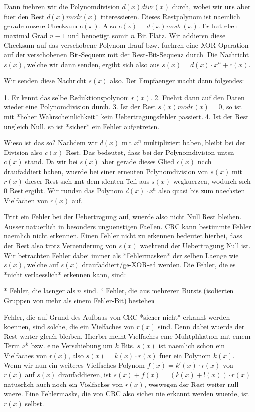 Dann fuehren wir die Polynomdivision $d(x) div r(x)$ durch, wobei wir uns aber
fuer den Rest $d(x) mod r(x)$ interessieren. Dieses Restpolynom ist naemlich
gerade unsere Checksum $c(x)$. Also $c(x) = d(x) mod r(x)$. Es hat eben maximal
Grad $n - 1$ und benoetigt somit $n$ Bit Platz. Wir addieren diese Checksum
auf das verschobene Polynom drauf bzw. fuehren eine XOR-Operation auf der
verschobenen Bit-Sequenz mit der Rest-Bit-Sequenz durch. Die Nachricht $s(x)$,
welche wir dann senden, ergibt sich also aus $s(x) = d(x) \cdot x^n + c(x)$.

Wir senden diese Nachricht $s(x)$ also. Der Empfaenger macht dann folgendes:

1. Er kennt das selbe Reduktionspolynom $r(x)$.
2. Fuehrt dann auf den Daten wieder eine Polynomdivision durch.
3. Ist der Rest $s(x) mod r(x) = 0$, so ist mit *hoher Wahrscheinlichkeit* kein
   Uebertragungsfehler passiert.
4. Ist der Rest ungleich Null, so ist *sicher* ein Fehler aufgetreten.

Wieso ist das so? Nachdem wir $d(x)$ mit $x^n$ multipliziert haben, bleibt bei
der Division also $c(x)$ Rest. Das bedeutet, dass bei der Polynomdivision unten
$c(x)$ stand. Da wir bei $s(x)$ aber gerade dieses Glied $c(x)$ noch
draufaddiert haben, wuerde bei einer erneuten Polynomdivision von $s(x)$ mit
$r(x)$ dieser Rest sich mit dem identen Teil aus $s(x)$ wegkuerzen, wodurch
sich 0 Rest ergibt. Wir runden das Polynom $d(x) \cdot x^n$ also quasi bis zum
naechsten Vielfachen von $r(x)$ auf.

Tritt ein Fehler bei der Uebertragung auf, wuerde also nicht Null Rest
bleiben. Ausser natuerlich in besonders unguenstigen Faellen. CRC kann bestimmte
Fehler naemlich nicht erkennen. Einen Fehler nicht zu erkennen bedeutet hierbei,
dass der Rest also trotz Veraenderung von $s(x)$ waehrend der Uebertragung Null
ist. Wir betrachten Fehler dabei immer als *Fehlermasken* der selben Laenge wie
$s(x)$, welche auf $s(x)$ draufaddiert/ge-XOR-ed werden. Die Fehler, die es
*nicht verlaesslich* erkennen kann, sind:

* Fehler, die laenger als $n$ sind.
* Fehler, die aus mehreren Bursts (isolierten Gruppen von mehr als einem Fehler-Bit)
  bestehen

Fehler, die auf Grund des Aufbaus von CRC *sicher nicht* erkannt werden koennen,
sind solche, die ein Vielfaches von $r(x)$ sind. Denn dabei wuerde der Rest
weiter gleich bleiben. Hierbei meint Vielfaches eine Mulitplikation mit einem
Term $x^k$ bzw. eine Verschiebung um $k$ Bits. $s(x)$ ist naemlich schon ein
Vielfaches von $r(x)$, also $s(x) = k(x) \cdot r(x)$ fuer ein Polynom
$k(x)$. Wenn wir nun ein weiteres Vielfaches Polynom $f(x) = k'(x) \cdot r(x)$
von $r(x)$ auf $s(x)$ draufaddieren, ist $s(x) + f(x) = (k(x) + l(x)) \cdot
r(x)$ natuerlich auch noch ein Vielfaches von $r(x)$, weswegen der Rest weiter
null waere. Eine Fehlermaske, die von CRC also sicher nie erkannt werden wuerde,
ist $r(x)$ selbst.

